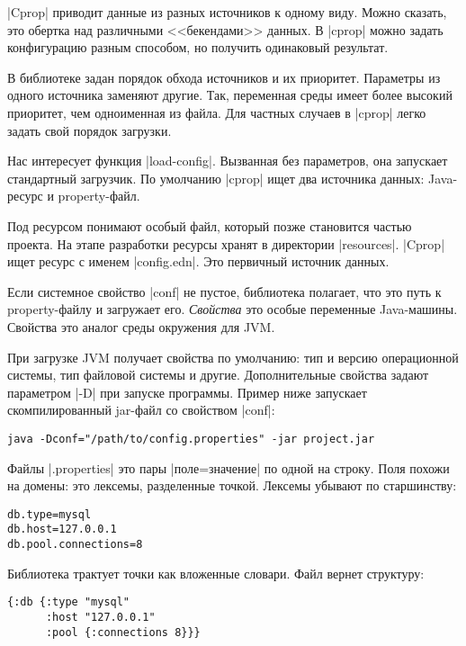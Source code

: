 \spverb|Cprop| приводит данные из разных источников к одному виду. Можно
сказать, это обертка над различными <<бекендами>> данных. В \spverb|cprop| можно
задать конфигурацию разным способом, но получить одинаковый результат.

В библиотеке задан порядок обхода источников и их приоритет. Параметры из одного
источника заменяют другие. Так, переменная среды имеет более высокий приоритет,
чем одноименная из файла. Для частных случаев в \spverb|cprop| легко задать свой
порядок загрузки.

Нас интересует функция \spverb|load-config|. Вызванная без параметров, она
запускает стандартный загрузчик. По умолчанию \spverb|cprop| ищет два источника
данных: Java-ресурс и property-файл.

Под ресурсом понимают особый файл, который позже становится частью проекта. На
этапе разработки ресурсы хранят в директории \spverb|resources|. \spverb|Cprop|
ищет ресурс с именем \spverb|config.edn|. Это первичный источник данных.

Если системное свойство \spverb|conf| не пустое, библиотека полагает, что это
путь к property-файлу и загружает его. \emph{Свойства} это особые переменные
Java-машины. Свойства это аналог среды окружения для JVM.

При загрузке JVM получает свойства по умолчанию: тип и версию операционной
системы, тип файловой системы и другие. Дополнительные свойства задают
параметром \spverb|-D| при запуске программы. Пример ниже запускает
скомпилированный jar-файл со свойством \spverb|conf|:

\begin{verbatim}
java -Dconf="/path/to/config.properties" -jar project.jar
\end{verbatim}

Файлы \spverb|.properties| это пары \spverb|поле=значение| по одной на
строку. Поля похожи на домены: это лексемы, разделенные точкой. Лексемы убывают
по старшинству:

\begin{verbatim}
db.type=mysql
db.host=127.0.0.1
db.pool.connections=8
\end{verbatim}

Библиотека трактует точки как вложенные словари. Файл вернет структуру:

\begin{verbatim}
{:db {:type "mysql"
      :host "127.0.0.1"
      :pool {:connections 8}}}
\end{verbatim}

